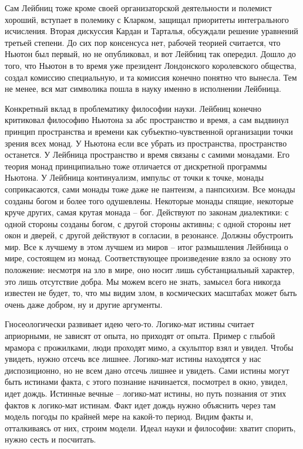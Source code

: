 \documentclass[a4paper, 12pt]{article}
\begin{document}
Сам Лейбниц тоже кроме своей организаторской деятельности и полемист 
хороший, вступает в полемику с Кларком, защищал приоритеты интегрального 
исчисления. Вторая дискуссия Кардан и Тарталья, обсуждали решение 
уравнений третьей степени. До сих пор консенсуса нет, рабочей теорией 
считается, что Ньютон был первый, но не опубликовал, и вот Лейбниц так 
опередил. Дошло до того, что Ньютон в то время уже президент Лондонского 
королевского общества, создал комиссию специальную, и та комиссия 
конечно понятно что вынесла. Тем не менее, вся мат символика пошла 
в науку именно в исполнении Лейбница.

Конкретный вклад в проблематику философии науки. Лейбниц конечно 
критиковал философию Ньютона за абс пространство и время, а сам выдвинул 
принцип пространства и времени как субъектно-чувственной организации 
точки зрения всех монад. У Ньютона если все убрать из пространства, 
пространство останется. У Лейбница пространство и время связаны с самими 
монадами. Его теория монад принципиально тоже отличается от дискретной 
программы Ньютона. У Лейбница континуализм, импульс от точки к точке, 
монады соприкасаются, сами монады тоже даже не пантеизм, а панпсихизм. 
Все монады созданы богом и более того одушевлены. Некоторые монады 
спящие, некоторые круче других, самая крутая монада -- бог. Действуют по 
законам диалектики: с одной стороны созданы богом, с другой стороны 
активны; с одной стороны нет окон и дверей, с другой действуют 
в согласии, в резонансе. Должны обустроить мир. Все к лучшему в этом 
лучшем из миров -- итог размышления Лейбница о мире, состоящем из монад. 
Соответствующее произведение взяло за основу это положение: несмотря на 
зло в мире, оно носит лишь субстанциальный характер, это лишь отсутствие 
добра. Мы можем всего не знать, замысел бога никогда известен не будет, 
то, что мы видим злом, в космических масштабах может быть очень даже 
добром, ну и другие аргументы.

Гносеологически развивает идею чего-то. Логико-мат истины считает 
априорными, не зависят от опыта, но приходят от опыта. Пример с глыбой 
мрамора с прожилками, люди проходят мимо, а скульптор взял и увидел. 
Чтобы увидеть, нужно отсечь все лишнее. Логико-мат истины находятся 
у нас диспозиционно, но не всем дано отсечь лишнее и увидеть. Сами 
истины могут быть истинами факта, с этого познание начинается, посмотрел 
в окно, увидел, идет дождь. Истинные вечные -- логико-мат истины, но 
путь познания от этих фактов к логико-мат истинам. Факт идет дождь нужно 
объяснить через там модель погоды по крайней мере на какой-то период. 
Видим факты и, отталкиваясь от них, строим модели. Идеал науки 
и философии: хватит спорить, нужно сесть и посчитать.
\end{document}
